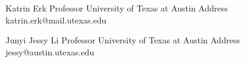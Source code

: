 %
%
%


\begin{referees}
		{Katrin Erk}
		{Professor}
		{University of Texas at Austin}
		{Address}
		{katrin.erk@mail.utexas.edu}

		{Junyi Jessy Li}
		{Professor}
		{University of Texas at Austin}
		{Address}
		{jessy@austin.utexas.edu}

\end{referees}